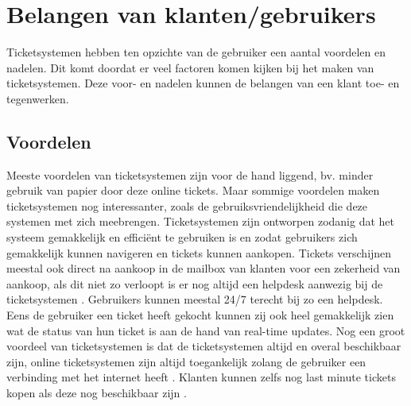 
\section{Belangen van klanten/gebruikers}
Ticketsystemen hebben ten opzichte van de gebruiker een aantal voordelen en nadelen. Dit komt doordat er veel factoren komen kijken bij het maken van ticketsystemen. 
Deze voor- en nadelen kunnen de belangen van een klant toe- en tegenwerken.

\subsection{Voordelen}
Meeste voordelen van ticketsystemen zijn voor de hand liggend, bv. minder gebruik van papier door deze online tickets.
Maar sommige voordelen maken ticketsystemen nog interessanter, zoals de gebruiksvriendelijkheid die deze systemen met zich meebrengen.
Ticketsystemen zijn ontworpen zodanig dat het systeem gemakkelijk en efficiënt te gebruiken is en zodat gebruikers zich gemakkelijk kunnen navigeren en tickets kunnen aankopen.
Tickets verschijnen meestal ook direct na aankoop in de mailbox van klanten voor een zekerheid van aankoop, als dit niet zo verloopt is er nog altijd een helpdesk aanwezig bij de ticketsystemen \cite{cm-voordelen}. 
Gebruikers kunnen meestal 24/7 terecht bij zo een helpdesk. Eens de gebruiker een ticket heeft gekocht kunnen zij ook heel gemakkelijk zien wat de status van hun ticket is aan de hand van real-time updates.
Nog een groot voordeel van ticketsystemen is dat de ticketsystemen altijd en overal beschikbaar zijn, online ticketsystemen zijn altijd toegankelijk zolang de gebruiker een verbinding met het internet heeft \cite{Benefitsonline2023}.
Klanten kunnen zelfs nog last minute tickets kopen als deze nog beschikbaar zijn \cite{cm-voordelen}.

